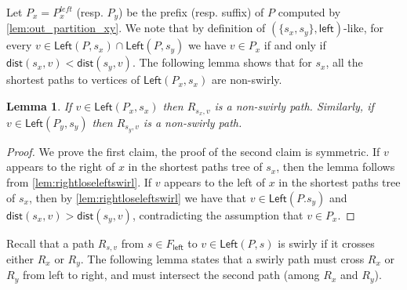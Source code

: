 \documentclass{article}
\newcommand{\Left}{\mathsf{Left}}
\newcommand{\leftside}{\mathsf{left}}
\newcommand{\dist}{\mathsf{dist}}
\newtheorem{lemma}{Lemma}
\begin{document}
Let $P_x=P^{left}_x$ (resp. $P_y$) be the prefix (resp. suffix) of $P$ computed by \cref{lem:out_partition_xy}.
We note that by definition of $(\{s_x,s_y\},\leftside)$-like, for every $v\in\Left(P,s_x)\cap\Left(P,s_y)$ we have $v\in P_x$ if and only if $\dist(s_x,v)<\dist(s_y,v)$.
The following lemma shows that for $s_x$, all the shortest paths to vertices of $\Left(P_x,s_x)$ are non-swirly.

\begin{lemma}\label{lem:sx-to-Px-non-swirly}
    If $v\in \Left(P_x,s_x)$ then $R_{s_x,v}$ is a non-swirly path.
    Similarly, if $v\in \Left(P_y,s_y)$ then $R_{s_y,v}$ is a non-swirly path.
\end{lemma}
\begin{proof}
    We prove the first claim, the proof of the second claim is symmetric.
    If $v$ appears to the right of $x$ in the shortest paths tree of $s_x$, then the lemma follows from \cref{lem:rightloseleftswirl}.
    If $v$ appears to the left of $x$ in the shortest paths tree of $s_x$, then by \cref{lem:rightloseleftswirl} we have that $v\in\Left(P.s_y)$ and $\dist(s_x,v)>\dist(s_y,v)$, contradicting the assumption that $v\in P_x$.
\end{proof}


Recall that a path $R_{s,v}$ from $s\in F_{\leftside}$ to $v\in \Left(P,s)$ is swirly if it crosses either $R_x$ or $R_y$.
The following lemma states that a swirly path must cross $R_x$ or $R_y$ from left to right, and must intersect the second path (among $R_x$ and $R_y$).
\end{document}
